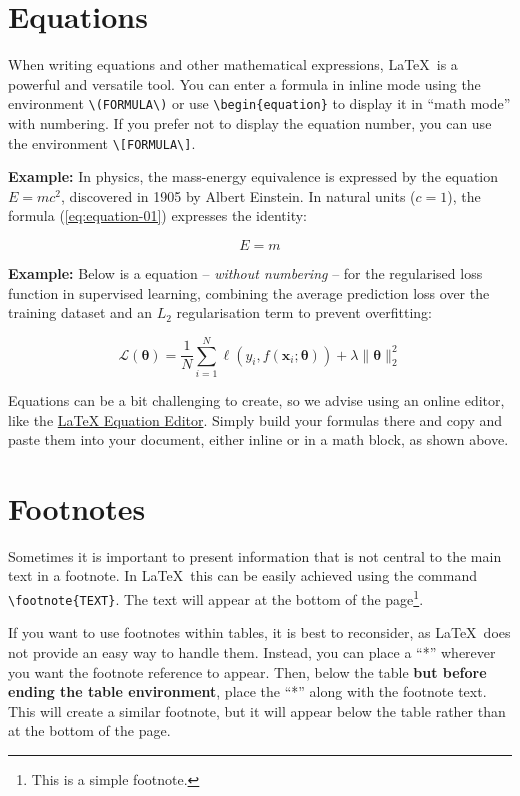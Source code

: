 \section{Equations}
When writing equations and other mathematical expressions, \LaTeX~is a powerful and versatile tool. You can enter a formula in inline mode using the environment \verb|\(FORMULA\)| or use \verb|\begin{equation}| to display it in ``math mode'' with numbering. If you prefer not to display the equation number, you can use the environment \verb|\[FORMULA\]|.

\vspace{.875em}
\textbf{Example:} In physics, the mass-energy equivalence is expressed by the equation \(E=mc^2\), discovered in 1905 by Albert Einstein. In natural units ($c = 1$), the formula (\ref{eq:equation-01}) expresses the identity:

\begin{equation}
\label{eq:equation-01}
E=m
\end{equation}

\textbf{Example:} Below is a equation -- \textit{without numbering} -- for the regularised loss function in supervised learning, combining the average prediction loss over the training dataset and an $L_2$ regularisation term to prevent overfitting:

\[
\mathcal{L}(\boldsymbol{\theta}) = \frac{1}{N} \sum_{i=1}^{N} \ell(y_i, f(\mathbf{x}_i; \boldsymbol{\theta})) + \lambda \|\boldsymbol{\theta}\|_2^2
\]

Equations can be a bit challenging to create, so we advise using an online editor, like the \href{https://latexeditor.lagrida.com/}{LaTeX Equation Editor}. Simply build your formulas there and copy and paste them into your document, either inline or in a math block, as shown above.

\section{Footnotes}
Sometimes it is important to present information that is not central to the main text in a footnote. In \LaTeX\, this can be easily achieved using the command \verb|\footnote{TEXT}|. The text will appear at the bottom of the page\footnote{This is a simple footnote.}.

If you want to use footnotes within tables, it is best to reconsider, as \LaTeX\ does not provide an easy way to handle them. Instead, you can place a ``*'' wherever you want the footnote reference to appear. Then, below the table \textbf{but before ending the table environment}, place the ``*'' along with the footnote text. This will create a similar footnote, but it will appear below the table rather than at the bottom of the page.